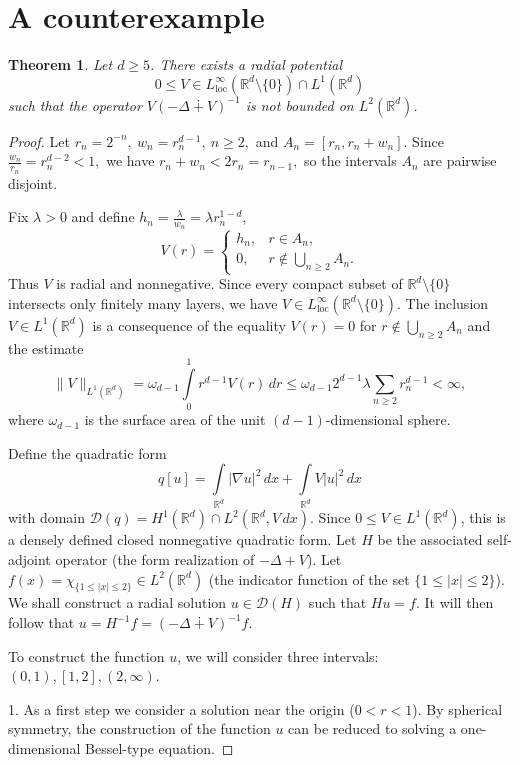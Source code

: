 \documentclass[11pt,reqno]{amsart}
\newtheorem{theorem}{Theorem}
\newcommand{\R}{{\mathbb R}}
\begin{document}
\section{A counterexample}
\begin{theorem}
Let $d\ge 5$. There exists a radial potential
$$0\le V\in L^\infty_{\mathrm{loc}}(\R^d\setminus\{0\})\cap L^1({\R^d})$$
such that the operator $V(-\Delta\dotplus V)^{-1}$ is not bounded on $L^2(\R^d)$.
\end{theorem}
\begin{proof}
Let $r_n=2^{-n},\ w_n=r_n^{d-1},\ n\ge 2,$ and $A_n=[r_n,r_n+w_n]$.
Since $\frac{w_n}{r_n}=r_n^{d-2}<1,$ we have $r_n+w_n<2r_n=r_{n-1},$ so the intervals $A_n$ are pairwise disjoint.
\par
Fix $\lambda>0$ and define $h_n=\frac{\lambda}{w_n}=\lambda r_n^{1-d}$,
$$V(r)=
\begin{cases}
h_n,&r\in A_n,\\
0,&r\notin\bigcup_{n\ge 2}A_n.
\end{cases}$$
Thus $V$ is radial and nonnegative. Since every compact subset of $\R^d\setminus\{0\}$ intersects only finitely many layers, we have $V\in L^\infty_{\mathrm{loc}}(\R^d\setminus\{0\}).$ The inclusion $V\in L^1(\R^d)$ is a consequence of the equality $V(r)=0$ for $r\notin\bigcup_{n\ge 2}A_n$ and the estimate
\begin{equation*}
\|V\|_{L^1(\R^d)}=\omega_{d-1}\int\limits_0^1 r^{d-1}V(r)\,dr\le \omega_{d-1} 2^{d-1}\lambda\sum_{n\ge 2}r_n^{d-1}<\infty,
\end{equation*}
where $\omega_{d-1}$ is the surface area of the unit $(d-1)$-dimensional sphere.
\par
Define the quadratic form
$$q[u]=\int\limits_{\R^d}|\nabla u|^2\,dx+\int\limits_{\R^d}V|u|^2\,dx$$
 with domain $\mathcal{D}(q)=H^1(\R^d)\cap L^2(\R^d,V\,dx)$. Since $0\le V\in L^1(\R^d)$, this is a densely defined closed nonnegative quadratic form. Let $H$ be the associated self-adjoint operator (the form realization of $-\Delta+V$).
 Let $f(x)=\chi_{\{1\le |x|\le 2\}}\in L^2(\R^d)$ (the indicator function of the set $\{1\le |x|\le 2\}$). We shall construct a radial solution $u\in \mathcal{D}(H)$ such that $Hu=f$. It will then follow that $u=H^{-1}f=(-\Delta\dotplus V)^{-1}f.$
\par
To construct the function $u$, we will consider three intervals: $(0,1), [1,2], (2,\infty)$.
\par
1. As a first step we consider a solution near the origin ($0 < r < 1$).
By spherical symmetry, the construction of the function $u$ can be reduced to solving a one-dimensional Bessel-type equation.

\end{proof}
\end{document}

